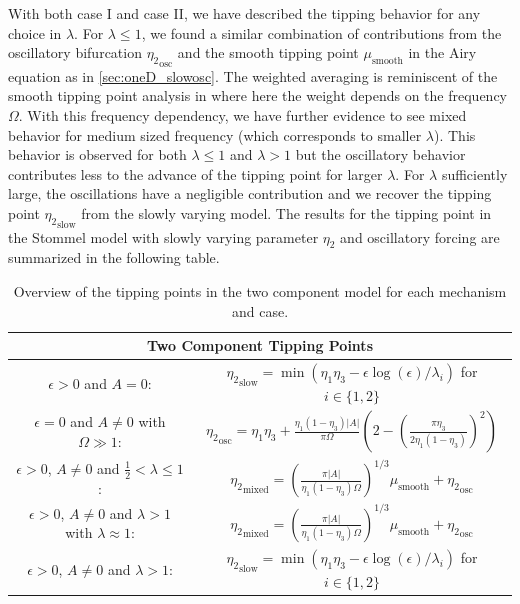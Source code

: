 \indent With both case I and case II, we have described the tipping behavior for any choice in $\lambda$. For $\lambda\le1$, we found a similar combination of contributions from the oscillatory bifurcation ${\eta_2}_{\text{osc}}$ and the smooth tipping point ${\mu}_{\text{smooth}}$ in the Airy equation as in \autoref{sec:oneD_slowosc}. The weighted averaging is reminiscent of the smooth tipping point analysis in \cite{zhu2015tipping} where here the weight depends on the frequency $\Omega$. With this frequency dependency, we have further evidence to see mixed behavior for medium sized frequency (which corresponds to smaller $\lambda$). This behavior is observed for both $\lambda\le 1$ and $\lambda>1$ but the oscillatory behavior contributes less to the advance of the tipping point for larger $\lambda$. For $\lambda$ sufficiently large, the oscillations have a negligible contribution and we recover the tipping point ${\eta_2}_{\text{slow}}$ from the slowly varying model. The results for the tipping point in the Stommel model with slowly varying parameter $\eta_2$ and oscillatory forcing are summarized in the following table.

\begin{table}[H]
\begin{center}
\begin{tabular}{|c|c|}
\hline 
 \multicolumn{2}{|c|}{Two Component Tipping Points} \\ 
\hline
$\epsilon>0$ and $A=0$: & ${\eta_2}_{\text{slow}}=\min(\eta_1\eta_3 -\epsilon\log(\epsilon)/\lambda_i)$ for $i\in\{1,2\}$ \\ 
\hline 
$\epsilon=0$ and $A\not=0$ with $\Omega\gg 1$: & ${\eta_2}_{\text{osc}}=\eta_1\eta_3+\frac{\eta_1(1-\eta_3)|A|}{\pi\Omega}\left(2-\left(\frac{\pi\eta_3}{2\eta_1(1-\eta_3)}\right)^2\right)$ \\ 
\hline 
$\epsilon>0$, $A\not=0$ and $\frac{1}{2}<\lambda\le 1$: & ${\eta_2}_{\text{mixed}}=\left(\frac{\pi |A|}{\eta_1(1-\eta_3)\Omega}\right)^{1/3} \mu_{\text{smooth}}+{\eta_2}_{\text{osc}}$ \\ 
\hline 
$\epsilon>0$, $A\not=0$ and $\lambda >1$ with $\lambda \approx 1$: &${\eta_2}_{\text{mixed}}=\left(\frac{\pi |A|}{\eta_1(1-\eta_3)\Omega}\right)^{1/3} \mu_{\text{smooth}}+{\eta_2}_{\text{osc}}$ \\ 
\hline 
$\epsilon>0$, $A\not=0$ and $\lambda>1$:
 & ${\eta_2}_{\text{slow}}=\min(\eta_1\eta_3 -\epsilon\log(\epsilon)/\lambda_i)$ for $i\in\{1,2\}$ \\
\hline
\end{tabular} 
\caption{Overview of the tipping points in the two component model for each mechanism and case.}
\end{center}
\end{table}

